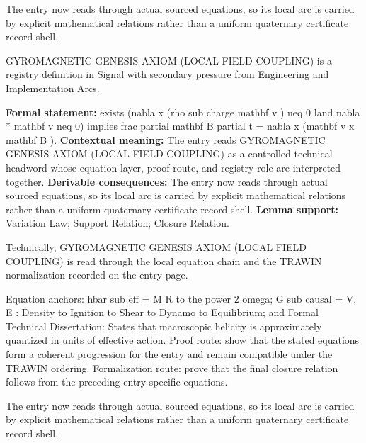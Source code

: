 The entry now reads through actual sourced equations, so its local arc is carried by explicit mathematical relations rather than a uniform quaternary certificate record shell.
\clearpage


\begingroup\small
{}
GYROMAGNETIC GENESIS AXIOM (LOCAL FIELD COUPLING) is a registry definition in Signal with secondary pressure from Engineering and Implementation Arcs.

\begingroup\footnotesize\setlength{\emergencystretch}{3em}\sloppy
\textbf{Formal statement:} exists (nabla x (rho sub charge mathbf v ) neq 0 land nabla * mathbf v neq 0) implies frac partial mathbf B partial t = nabla x (mathbf v x mathbf B ). \textbf{Contextual meaning:} The entry reads GYROMAGNETIC GENESIS AXIOM (LOCAL FIELD COUPLING) as a controlled technical headword whose equation layer, proof route, and registry role are interpreted together. \textbf{Derivable consequences:} The entry now reads through actual sourced equations, so its local arc is carried by explicit mathematical relations rather than a uniform quaternary certificate record shell. \textbf{Lemma support:} Variation Law; Support Relation; Closure Relation.\par
\endgroup

Technically, GYROMAGNETIC GENESIS AXIOM (LOCAL FIELD COUPLING) is read through the local equation chain and the TRAWIN normalization recorded on the entry page.

Equation anchors: hbar sub eff = M R to the power 2 omega; G sub causal = V, E : Density to Ignition to Shear to Dynamo to Equilibrium; and Formal Technical Dissertation: States that macroscopic helicity is approximately quantized in units of effective action. Proof route: show that the stated equations form a coherent progression for the entry and remain compatible under the TRAWIN ordering. Formalization route: prove that the final closure relation follows from the preceding entry-specific equations.

The entry now reads through actual sourced equations, so its local arc is carried by explicit mathematical relations rather than a uniform quaternary certificate record shell.
\endgroup

